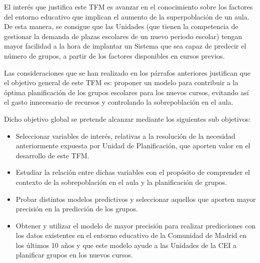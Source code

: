 El interés que justifica este TFM es avanzar en el conocimiento sobre los factores del entorno educativo que implican el aumento de la superpoblación de un aula. De esta manera, se consigue que las Unidades (que tienen la competencia de gestionar la demanda de plazas escolares de un nuevo periodo escolar) tengan mayor facilidad a la hora de implantar un Sistema que sea capaz de predecir el número de grupos, a partir de los factores disponibles en cursos previos.

Las consideraciones que se han realizado en los párrafos anteriores justifican que el objetivo general de este TFM es: proponer un modelo para contribuir a la óptima planificación de los grupos escolares para los nuevos cursos, evitando así el gasto innecesario de recursos y controlando la sobrepoblación en el aula.

Dicho objetivo global se pretende alcanzar mediante los siguientes sub objetivos:
\begin{itemize}
	\item Seleccionar variables de interés, relativas a la resolución de la necesidad anteriormente expuesta por Unidad de Planificación, que aporten valor en el desarrollo de este TFM. 
	\item Estudiar la relación entre dichas variables con el propósito de comprender el contexto de la sobrepoblación en el aula y la planificación de grupos.
	\item Probar distintos modelos predictivos y seleccionar aquellos que aporten mayor precisión en la predicción de los grupos. 
	\item Obtener y utilizar el modelo de mayor precisión para realizar predicciones con los datos existentes en el entorno educativo de la Comunidad de Madrid en los últimos 10 años y que este modelo ayude a las Unidades de la CEI a planificar grupos en los nuevos cursos. 
\end{itemize}

